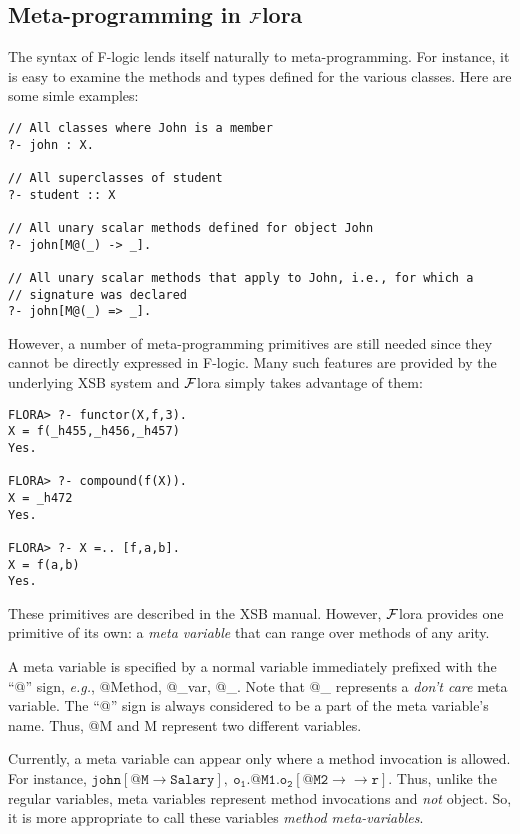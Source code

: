 \documentclass[11pt]{article}
\newcommand{\fd}{\ensuremath{{\rightarrow}}}                   %
\newcommand{\mvd}{\ensuremath{{\rightarrow\!\!\!\!\rightarrow}}}  %
\newcommand{\FLORA}{{\mbox{${\cal F}${\sc lora}}}\xspace}
\newcommand{\fl}{{F-logic}\xspace}
\begin{document}
\subsection{Meta-programming in \FLORA}

The syntax of \fl lends itself naturally to meta-programming. For instance,
it is easy to examine the methods and types defined for the various classes.
Here are some simle examples:
\begin{verbatim}
// All classes where John is a member
?- john : X.  

// All superclasses of student
?- student :: X

// All unary scalar methods defined for object John
?- john[M@(_) -> _].

// All unary scalar methods that apply to John, i.e., for which a
// signature was declared
?- john[M@(_) => _].
\end{verbatim}
However, a number of meta-programming primitives are still needed
since they cannot be directly expressed in \fl. Many such features are
provided by the underlying XSB system and \FLORA simply takes advantage of
them: 
\begin{verbatim}
FLORA> ?- functor(X,f,3).
X = f(_h455,_h456,_h457)
Yes.

FLORA> ?- compound(f(X)).
X = _h472
Yes.

FLORA> ?- X =.. [f,a,b].
X = f(a,b)
Yes.
\end{verbatim}
These primitives are described in the XSB manual. However, \FLORA provides
one primitive of its own: a {\em meta variable\/} that can range over methods of
any arity.

A meta variable is specified by a normal variable immediately prefixed with
the ``@'' sign, {\it e.g.}, @Method, @\_var, @\_. Note that @\_ represents
a \emph{don't care} meta variable. The ``@'' sign is always considered to
be a part of the meta variable's name.  Thus, @M and M represent two
different variables.

Currently, a meta variable can appear only where a method invocation is
allowed. For instance, $\mathtt{john[@M{\fd}Salary],~
  o_1.@M1.o_2[@M2{\mvd}r]}$. Thus, unlike the regular variables, meta
variables represent method invocations and \emph{not} object.  So, it is
more appropriate to call these variables \emph{method meta-variables}.
\end{document}
